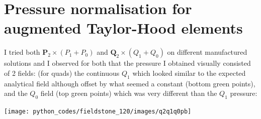 \begin{multicols}{2}


%
\end{multicols}

\begin{multicols}{2}


%
\end{multicols}











\newpage
\section*{Pressure normalisation for augmented Taylor-Hood elements}


I tried both ${\bm P}_2\times (P_1+P_0)$ and ${\bm Q}_2\times (Q_1+Q_0)$ on different manufactured solutions 
and I observed for both that the pressure I obtained visually consisted of 2 fields: (for quads) 
the continuous $Q_1$ which looked similar to the expected analytical field although offset by what 
seemed a constant (bottom green points), and the $Q_0$ field (top green points) which was 
very different than the $Q_1$ pressure:

\begin{center}
\texttt{[image: python\_codes/fieldstone\_120/images/q2q1q0pb]}
\end{center}

